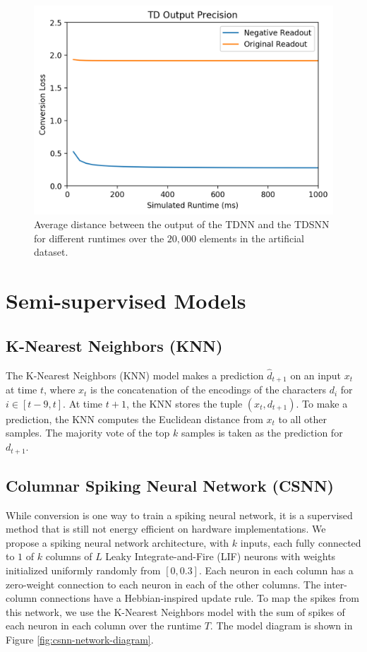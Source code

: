 \documentclass{article}
\begin{document}
\begin{figure}[H]
    \centering
    \includegraphics[width=0.8\linewidth]{../results/conversion-loss.png}
    \caption{Average distance between the output of the TDNN and the TDSNN for different runtimes over the $20,000$ elements in the artificial dataset.}
    \label{fig:clfig}
\end{figure}

\section*{Semi-supervised Models}

\subsection*{K-Nearest Neighbors (KNN)}

The K-Nearest Neighbors (KNN) model makes a prediction $\hat{d}_{t+1}$ on an input $x_t$ at time $t$, where $x_t$ is the concatenation of the encodings of the characters $d_i$ for $i \in [t-9, t]$. At time $t+1$, the KNN stores the tuple $(x_t, d_{t+1})$. To make a prediction, the KNN computes the Euclidean distance from $x_t$ to all other samples. The majority vote of the top $k$ samples is taken as the prediction for $d_{t+1}$.

\subsection*{Columnar Spiking Neural Network (CSNN)}

While conversion is one way to train a spiking neural network, it is a supervised method that is still not energy efficient on hardware implementations. We propose a spiking neural network architecture, with $k$ inputs, each fully connected to $1$ of $k$ columns of $L$ Leaky Integrate-and-Fire (LIF) neurons with weights initialized uniformly randomly from $\left[0, 0.3\right]$. \cite{gerstner2002spiking} Each neuron in each column has a zero-weight connection to each neuron in each of the other columns. The inter-column connections have a Hebbian-inspired update rule. To map the spikes from this network, we use the K-Nearest Neighbors model with the sum of spikes of each neuron in each column over the runtime $T$. \cite{beliaev2007time} The model diagram is shown in Figure \ref{fig:csnn-network-diagram}.
\end{document}
